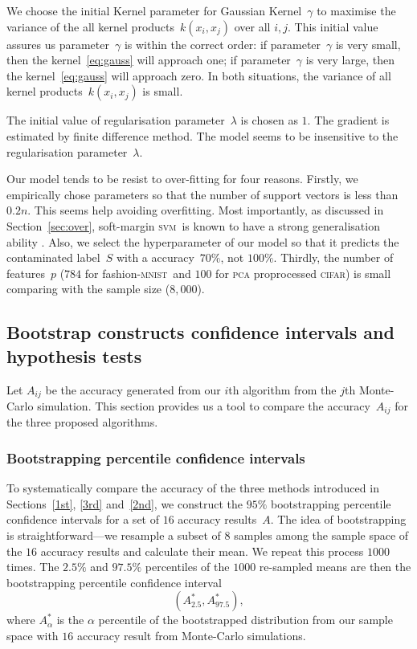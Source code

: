 \documentclass[12pt]{article} %
\newcommand{\svm}{\textsc{svm}}
\newcommand{\mnist}{fashion-\textsc{mnist}}
\begin{document}
We choose the initial Kernel parameter for Gaussian Kernel~$\gamma$  to maximise the variance of the all kernel products~$k(x_i,x_j)$ over all $i,j$. 
This initial value assures us parameter~$\gamma$ is within the correct order: if parameter~$\gamma$ is very small, then the kernel~\eqref{eq:gauss} will approach one; if parameter~$\gamma$ is very large, then the kernel~\eqref{eq:gauss} will approach zero. In both situations, the variance of all kernel products~$k(x_i,x_j)$ is small.

The initial value of regularisation parameter~$\lambda$ is chosen as $1$.
The gradient is estimated by finite difference method.
The model seems to be insensitive to the regularisation parameter~$\lambda$.

Our model tends to be resist to over-fitting for four reasons. Firstly, we empirically chose parameters so that the number of support vectors is less than $0.2n$. This seems help avoiding overfitting. Most importantly, as discussed in Section~\ref{sec:over}, soft-margin \svm\ is known to have a strong generalisation ability \citep{NIPS2012_4500,Cortes1995,Seeger:2003:PGE:944919.944929}. Also, we select the hyperparameter of our model so that it predicts the contaminated label~$S$ with a accuracy~$70\%$, not $100\%$. Thirdly, the number of features~$p$ ($784$ for \mnist\ and $100$ for \textsc{pca} proprocessed \textsc{cifar}) is small comparing with the sample size ($8,000$).

\subsection{Bootstrap constructs confidence intervals and hypothesis tests}
Let $A_{ij}$ be the accuracy generated from our {$i$}th algorithm from the $j$th Monte-Carlo simulation. This section provides us a tool to compare the accuracy~$A_{ij}$ for the three proposed algorithms.
\subsubsection{Bootstrapping percentile confidence intervals}\label{ci}
To systematically compare the accuracy of the three methods introduced in Sections~\ref{1st}, \ref{3rd} and~\ref{2nd}, we construct the $95\%$ bootstrapping percentile confidence intervals for a set of $16$ accuracy results~$A$. The idea of bootstrapping  is straightforward---we resample a subset of $8$ samples among the sample space of the $16$ accuracy results and calculate their mean. We repeat this process $1000$ times. The $2.5\%$ and $97.5\%$ percentiles of the $1000$ re-sampled means are then the bootstrapping percentile confidence interval
\begin{equation}
({A}^*_{2.5}, {A}^*_{97.5}), \label{eq:boot}
\end{equation}
where $A^*_{\alpha}$ is the $\alpha$ percentile of the bootstrapped distribution from our sample space with $16$ accuracy result from Monte-Carlo simulations.
\end{document}
